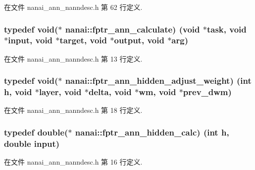 在文件 nanai\+\_\+ann\+\_\+nanndesc.\+h 第 62 行定义.

\hypertarget{namespacenanai_ac1a3ebd721fc3cfe1b9accfe7b65b7fe}{}
\subsubsection[{fptr\+\_\+ann\+\_\+calculate}]{\setlength{\rightskip}{0pt plus 5cm}typedef void($\ast$ nanai\+::fptr\+\_\+ann\+\_\+calculate) (void $\ast$task, void $\ast$input, void $\ast$target, void $\ast$output, void $\ast$arg)}\label{namespacenanai_ac1a3ebd721fc3cfe1b9accfe7b65b7fe}


在文件 nanai\+\_\+ann\+\_\+nanndesc.\+h 第 13 行定义.

\hypertarget{namespacenanai_a1d9a4524c199b1a2891e208ce4b05306}{}
\subsubsection[{fptr\+\_\+ann\+\_\+hidden\+\_\+adjust\+\_\+weight}]{\setlength{\rightskip}{0pt plus 5cm}typedef void($\ast$ nanai\+::fptr\+\_\+ann\+\_\+hidden\+\_\+adjust\+\_\+weight) (int h, void $\ast$layer, void $\ast$delta, void $\ast$wm, void $\ast$prev\+\_\+dwm)}\label{namespacenanai_a1d9a4524c199b1a2891e208ce4b05306}


在文件 nanai\+\_\+ann\+\_\+nanndesc.\+h 第 18 行定义.

\hypertarget{namespacenanai_a299d9093f72831a48d205e94e200690c}{}
\subsubsection[{fptr\+\_\+ann\+\_\+hidden\+\_\+calc}]{\setlength{\rightskip}{0pt plus 5cm}typedef double($\ast$ nanai\+::fptr\+\_\+ann\+\_\+hidden\+\_\+calc) (int h, double input)}\label{namespacenanai_a299d9093f72831a48d205e94e200690c}


在文件 nanai\+\_\+ann\+\_\+nanndesc.\+h 第 16 行定义.


